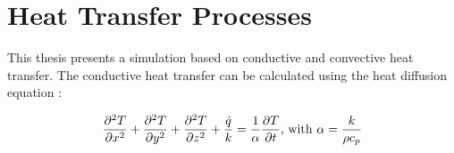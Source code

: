     


























\section{Heat Transfer Processes}


This thesis presents a simulation based on conductive and convective heat transfer. 
The conductive heat transfer can be calculated using the heat diffusion equation \cite{bergman2011fundamentals}:
	
	\begin{equation} 
	\frac{\partial^2 T}{\partial x^2}+
	\frac{\partial^2 T}{\partial y^2}+
	\frac{\partial^2 T}{\partial z^2}+ 
	\frac{\dot{q}}{k}= \frac{1}{\alpha}\frac{\partial T}{\partial t} \text{, with } \alpha = \frac{k}{\rho c_p}\quad \\
	\end{equation}
	
